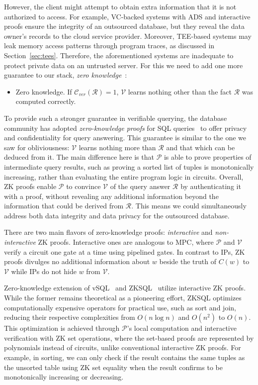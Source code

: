 \documentclass[11pt]{article}
\newcommand{\answer}{$\mathcal{R}$\xspace}
\newcommand{\prover}{$\mathcal{P}$\xspace}
\newcommand{\verifier}{$\mathcal{V}$\xspace}
\newcommand{\zkps}{ZK proofs\xspace} %
\begin{document}
However, the client might attempt to obtain extra information that it is not authorized to access. For example, VC-backed systems with ADS and interactive proofs ensure the integrity of an outsourced database, but they reveal the data owner's records to the cloud service provider. Moreover, TEE-based systems may leak memory access patterns through program traces, as discussed in Section~\ref{sec:tees}. Therefore, the aforementioned systems are inadequate to protect private data on an untrusted server. For this we need to add one more guarantee to our stack, {\em zero knowledge}~\cite{goldreich1991zkp,goldwasser1985zkp}:
\vspace{-0.2cm}
\begin{itemize}
    \item Zero knowledge. If  $\mathcal{C}_{ver}(\mathcal{R})=1$, \verifier learns nothing other than the fact \answer was computed correctly.
\end{itemize}
\vspace{-0.2cm}
To provide such a stronger guarantee in verifiable querying, the database community has adopted {\it zero-knowledge proofs} for SQL queries~\cite{zhang2017vsqlzk, li2023zksql} to offer privacy and confidentiality for query answering.  This guarantee is similar to the one we saw for obliviousness: \verifier learns nothing more than \answer and that which can be deduced from it.  The main difference here is that \prover is able to prove  properties of intermediate query results, such as proving a sorted list of tuples is monotonically increasing, rather than evaluating the entire program logic in circuits. Overall, \zkps enable \prover to convince \verifier of the query answer \answer by authenticating it with a proof, without revealing any additional information beyond the information that could be derived from \answer. This means we could simultaneously address both data integrity and data privacy for the outsourced database.



There are two main flavors of zero-knowledge proofs: {\it interactive} and {\it non-interactive} \zkps.  Interactive ones are analogous to MPC, where \prover and \verifier verify a circuit one gate at a time using pipelined gates. In contrast to IPs, \zkps divulges no additional information about $w$ beside the truth of $C(w)$ to \verifier while IPs do not hide $w$ from \verifier.

Zero-knowledge extension of vSQL~\cite{zhang2017vsqlzk} and ZKSQL~\cite{li2023zksql} utilize interactive \zkps. While the former remains theoretical as a pioneering effort, ZKSQL optimizes computationally expensive operators for practical use, such as sort and join, reducing their respective complexities from $O(n \log n)$ and $O(n^2)$ to $O(n)$. This optimization is achieved through \prover's local computation and interactive verification with ZK set operations, where the set-based proofs are represented by polynomials instead of circuits, unlike conventional interactive \zkps. For example, in sorting, we can only check if the result contains the same tuples as the unsorted table using ZK set equality when the result confirms to be monotonically increasing or decreasing.
\end{document}
